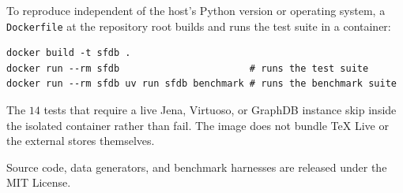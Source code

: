 To reproduce independent of the host's Python version or
operating system, a \texttt{Dockerfile} at the repository root builds
and runs the test suite in a container:

\begin{verbatim}
docker build -t sfdb .
docker run --rm sfdb                       # runs the test suite
docker run --rm sfdb uv run sfdb benchmark # runs the benchmark suite
\end{verbatim}

The $14$ tests that require a live Jena, Virtuoso, or GraphDB instance
skip inside
the isolated container rather than fail. The image does not bundle TeX
Live or the external stores themselves.

Source code, data generators, and benchmark harnesses are released under
the MIT License.
